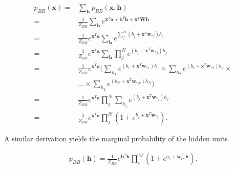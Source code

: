 \documentclass[twoside,english]{uiofysmaster}
\begin{document}
\begin{align}
	p_{BB} (\bm{x}) =& \sum_{\bm{h}} p_{BB} (\bm{x}, \bm{h}) \\
	=& \frac{1}{Z_{BB}} \sum_{\bm{h}} e^{\bm{x}^T \bm{a} + \bm{b}^T \bm{h} + \bm{x}^T \bm{W} \bm{h}} \nonumber \\
	=& \frac{1}{Z_{BB}} e^{\bm{x}^T \bm{a}} \sum_{\bm{h}} e^{\sum_j^N (b_j + \bm{x}^T \bm{w}_{\ast j})h_j} \nonumber \\
	=& \frac{1}{Z_{BB}} e^{\bm{x}^T \bm{a}} \sum_{\bm{h}} \prod_j^N e^{ (b_j + \bm{x}^T \bm{w}_{\ast j})h_j} \nonumber \\
	=& \frac{1}{Z_{BB}} e^{\bm{x}^T \bm{a}} \bigg ( \sum_{h_1} e^{(b_1 + \bm{x}^T \bm{w}_{\ast 1})h_1}
	\times \sum_{h_2} e^{(b_2 + \bm{x}^T \bm{w}_{\ast 2})h_2} \times \nonumber \\
	& ... \times \sum_{h_2} e^{(b_N + \bm{x}^T \bm{w}_{\ast N})h_N} \bigg ) \nonumber \\
	=& \frac{1}{Z_{BB}} e^{\bm{x}^T \bm{a}} \prod_j^N \sum_{h_j} e^{(b_j + \bm{x}^T \bm{w}_{\ast j}) h_j} \nonumber \\
	=& \frac{1}{Z_{BB}} e^{\bm{x}^T \bm{a}} \prod_j^N (1 + e^{b_j + \bm{x}^T \bm{w}_{\ast j}}) .
\end{align}

A similar derivation yields the marginal probability of the hidden units

\begin{align}
	p_{BB} (\bm{h}) = \frac{1}{Z_{BB}} e^{\bm{b}^T \bm{h}} \prod_i^M (1 + e^{a_i + \bm{w}_{i\ast}^T \bm{h}}) .
\end{align}
\end{document}

